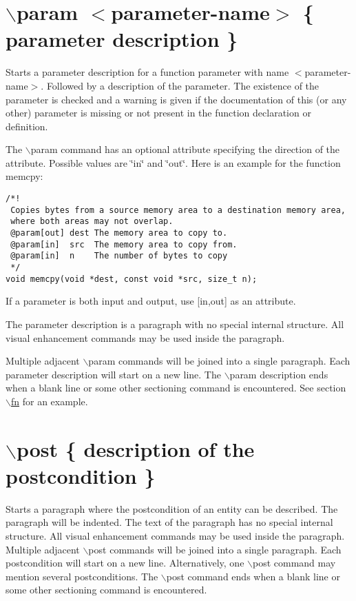 \hypertarget{commands_cmdparam}{}\section{$\backslash$param $<$parameter-name$>$ \{ parameter description \}}\label{commands_cmdparam}
 Starts a parameter description for a function parameter with name $<$parameter-name$>$. Followed by a description of the parameter. The existence of the parameter is checked and a warning is given if the documentation of this (or any other) parameter is missing or not present in the function declaration or definition.

The $\backslash$param command has an optional attribute specifying the direction of the attribute. Possible values are \char`\"{}in\char`\"{} and \char`\"{}out\char`\"{}. Here is an example for the function memcpy: 

\begin{Code}\begin{verbatim}/*!
 Copies bytes from a source memory area to a destination memory area,
 where both areas may not overlap.
 @param[out] dest The memory area to copy to.
 @param[in]  src  The memory area to copy from.
 @param[in]  n    The number of bytes to copy
 */
void memcpy(void *dest, const void *src, size_t n);
\end{verbatim}
\end{Code}

 If a parameter is both input and output, use \mbox{[}in,out\mbox{]} as an attribute.

The parameter description is a paragraph with no special internal structure. All visual enhancement commands may be used inside the paragraph.

Multiple adjacent $\backslash$param commands will be joined into a single paragraph. Each parameter description will start on a new line. The $\backslash$param description ends when a blank line or some other sectioning command is encountered. See section \hyperlink{commands_cmdfn}{$\backslash$fn} for an example.



 \hypertarget{commands_cmdpost}{}\section{$\backslash$post \{ description of the postcondition \}}\label{commands_cmdpost}
 Starts a paragraph where the postcondition of an entity can be described. The paragraph will be indented. The text of the paragraph has no special internal structure. All visual enhancement commands may be used inside the paragraph. Multiple adjacent $\backslash$post commands will be joined into a single paragraph. Each postcondition will start on a new line. Alternatively, one $\backslash$post command may mention several postconditions. The $\backslash$post command ends when a blank line or some other sectioning command is encountered.



